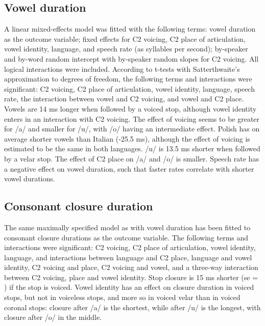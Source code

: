 \documentclass[]{JASAnew}
\begin{document}
\hypertarget{vowel-duration}{%
\subsection{Vowel duration}\label{vowel-duration}}

A linear mixed-effects model was fitted with the following terms: vowel
duration as the outcome variable; fixed effects for C2 voicing, C2 place
of articulation, vowel identity, language, and speech rate (as syllables
per second); by-speaker and by-word random intercept with by-speaker
random slopes for C2 voicing. All logical interactions were included.
According to t-tests with Satterthwaite's approximation to degrees of
freedom, the following terms and interactions were significant: C2
voicing, C2 place of articulation, vowel identity, language, speech
rate, the interaction between vowel and C2 voicing, and vowel and C2
place. Vowels are 14 ms longer when followed by a voiced stop, although
vowel identity enters in an interaction with C2 voicing. The effect of
voicing seems to be greater for /a/ and smaller for /u/, with /o/ having
an intermediate effect. Polish has on average shorter vowels than
Italian (-25.5 ms), although the effect of voicing is estimated to be
the same in both languages. /u/ is 13.5 ms shorter when followed by a
velar stop. The effect of C2 place on /a/ and /o/ is smaller. Speech
rate has a negative effect on vowel duration, such that faster rates
correlate with shorter vowel durations.

\hypertarget{consonant-closure-duration}{%
\subsection{Consonant closure
duration}\label{consonant-closure-duration}}

The same maximally specified model as with vowel duration has been
fitted to consonant closure durations as the outcome variable. The
following terms and interactions were significant: C2 voicing, C2 place
of articulation, vowel identity, language, and interactions between
language and C2 place, language and vowel identity, C2 voicing and
place, C2 voicing and vowel, and a three-way interaction between C2
voicing, place and vowel identity. Stop closure is 15 ms shorter (se = )
if the stop is voiced. Vowel identity has an effect on closure duration
in voiced stops, but not in voiceless stops, and more so in voiced velar
than in voiced coronal stops: closure after /a/ is the shortest, while
after /u/ is the longest, with closure after /o/ in the middle.
\end{document}
